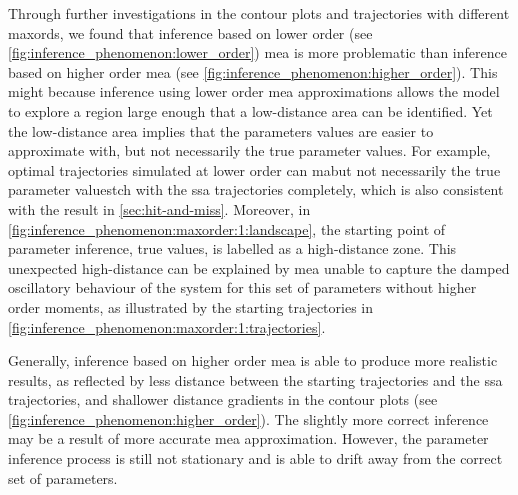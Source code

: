 Through further investigations in the contour plots and trajectories with different \gls{maxord}s, 
we found that inference based on lower order 
(see \autoref{fig:inference_phenomenon:lower_order}) 
\gls{mea} is more problematic than inference based on higher order \gls{mea} 
(see \autoref{fig:inference_phenomenon:higher_order}). 
This might because inference using lower order \gls{mea} approximations allows the \pft{} model to explore a region large enough that a low-distance area can be identified.
Yet the low-distance area  implies that the parameters values are easier to approximate with, but not necessarily the true parameter values.
For example, optimal trajectories simulated at lower order can mabut not necessarily the true parameter valuestch with the \gls{ssa} trajectories completely, which is also consistent with the result in \autoref{sec:hit-and-miss}. 
Moreover, in \autoref{fig:inference_phenomenon:maxorder:1:landscape}, 
the starting point of parameter inference, \ie{} true values, is labelled as a high-distance zone. 
This unexpected high-distance can be explained by \gls{mea} unable to capture the damped oscillatory behaviour of the system for this set of parameters without higher order moments, as illustrated by the starting trajectories in \autoref{fig:inference_phenomenon:maxorder:1:trajectories}. 
 

Generally, inference based on higher order \gls{mea} is able to produce more realistic results, as reflected by less distance between the starting trajectories and the \gls{ssa} trajectories, and shallower distance gradients in the contour plots (see \autoref{fig:inference_phenomenon:higher_order}). The slightly more correct inference may be a result of more accurate \gls{mea} approximation. However, the parameter inference process is still not stationary and is able to drift away from the correct set of parameters.


